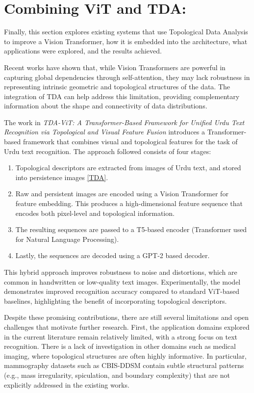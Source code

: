 \documentclass[ENG]{TFUOC}%
\begin{document}
\section{Combining ViT and TDA:}\label{Vit_and_TDA}

Finally, this section explores existing systems that use Topological Data Analysis to improve a Vision Transformer, how it is embedded into the architecture, what applications were explored, and the results achieved.

Recent works have shown that, while Vision Transformers are powerful in capturing global dependencies through self-attention, they may lack robustness in representing intrinsic geometric and topological structures of the data. 
The integration of TDA can help address this limitation, providing complementary information about the shape and connectivity of data distributions.

The work in \textit{TDA-ViT: A Transformer-Based Framework for Unified Urdu Text Recognition via Topological and Visual Feature Fusion} \cite{tda_vit_1} introduces a Transformer-based framework that combines visual and topological features for the task of Urdu text recognition. The approach followed consists of four stages:

\begin{enumerate}
    \item Topological descriptors are extracted from images of Urdu text, and stored into persistence images \ref{TDA}.
    \item Raw and persistent images are encoded using a Vision Transformer for feature embedding. This produces a high-dimensional feature sequence that encodes both pixel-level and topological information.
    \item The resulting sequences are passed to a T5-based encoder (Transformer used for Natural Language Processing).
    \item Lastly, the sequences are decoded using a GPT-2 based decoder.
\end{enumerate}

This hybrid approach improves robustness to noise and distortions, which are common in handwritten or low-quality text images. Experimentally, the model demonstrates improved recognition accuracy compared to standard ViT-based baselines, highlighting the benefit of incorporating topological descriptors.

Despite these promising contributions, there are still several limitations and open challenges that motivate further research. First, the application domains explored in the current literature remain relatively limited, with a strong focus on text recognition. There is a lack of investigation in other domains such as medical imaging, where topological structures are often highly informative. In particular, mammography datasets such as CBIS-DDSM contain subtle structural patterns (e.g., mass irregularity, spiculation, and boundary complexity) that are not explicitly addressed in the existing works.
\end{document}
